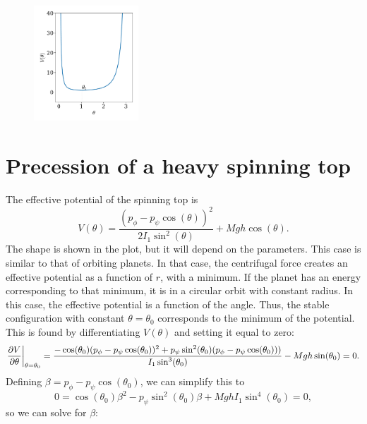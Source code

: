 \documentclass{article}
\begin{document}
        \begin{figure}
            \includegraphics[width=0.35\textwidth]{figures/exercise_3_plot.pdf}
            \vspace{-2cm}
        \end{figure}
    \section{Precession of a heavy spinning top}
        The effective potential of the spinning top is
        \begin{equation*}
            V(\theta) = \frac{\left(p_{\phi} - p_{\psi}\cos(\theta)\right)^2}{2 I_1 \sin^2(\theta)} + Mgh\cos(\theta).
        \end{equation*}
        The shape is shown in the plot, but it will depend on the parameters. This case is similar to that of orbiting planets. In that case, the centrifugal force creates an effective potential as a function of $r$, with a minimum. If the planet has an energy corresponding to that minimum, it is in a circular orbit with constant radius. In this case, the effective potential is a function of the angle. Thus, the stable configuration with constant $\theta = \theta_0$ corresponds to the minimum of the potential. This is found by differentiating $V(\theta)$ and setting it equal to zero:
        \begin{equation*}
            \pdv{V}{\theta} \bigg |_{\theta = \theta_0} = \frac{-\cos(\theta_0)(p_\phi - p_\psi \cos(\theta_0))^2 + p_\psi \sin^2(\theta_0)(p_\phi - p_\psi \cos(\theta_0)))}{I_1 \sin^3(\theta_0)} - Mgh \sin(\theta_0) = 0.
        \end{equation*}
        Defining $\beta = p_\phi - p_\psi \cos(\theta_0)$, we can simplify this to
        \begin{equation*}
            0 = \cos(\theta_0) \beta^2 - p_\psi \sin^2(\theta_0) \beta  + MghI_1\sin^4(\theta_0) = 0, 
        \end{equation*}
        so we can solve for $\beta$:
\end{document}
